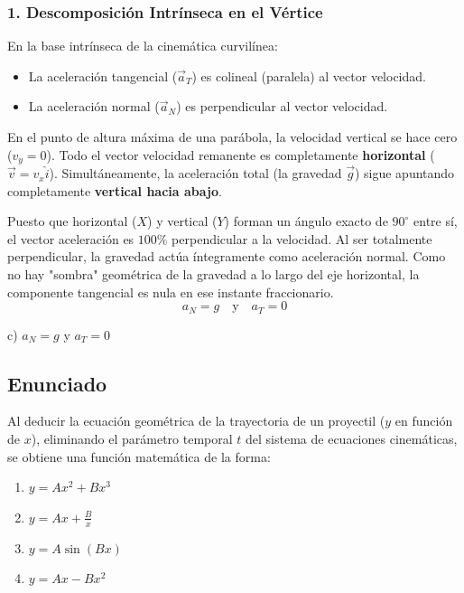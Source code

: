 \documentclass[12pt, a4paper]{article}
\begin{document}
\subsubsection*{1. Descomposición Intrínseca en el Vértice}
En la base intrínseca de la cinemática curvilínea:
\begin{itemize}
    \item La aceleración tangencial ($\vec{a}_T$) es colineal (paralela) al vector velocidad.
    \item La aceleración normal ($\vec{a}_N$) es perpendicular al vector velocidad.
\end{itemize}

En el punto de altura máxima de una parábola, la velocidad vertical se hace cero ($v_y = 0$). Todo el vector velocidad remanente es completamente \textbf{horizontal} ($\vec{v} = v_x\hat{i}$).
Simultáneamente, la aceleración total (la gravedad $\vec{g}$) sigue apuntando completamente \textbf{vertical hacia abajo}.

Puesto que horizontal ($X$) y vertical ($Y$) forman un ángulo exacto de $90^\circ$ entre sí, el vector aceleración es $100\%$ perpendicular a la velocidad. 
Al ser totalmente perpendicular, la gravedad actúa íntegramente como aceleración normal. Como no hay "sombra" geométrica de la gravedad a lo largo del eje horizontal, la componente tangencial es nula en ese instante fraccionario.
$$ a_N = g \quad \text{y} \quad a_T = 0 $$

\begin{tcolorbox}[colback=green!5!white, colframe=green!50!black, title=Respuesta Final]
\centering \Large c) $a_N = g$ y $a_T = 0$
\end{tcolorbox}

\newpage

\subsection*{Enunciado}
Al deducir la ecuación geométrica de la trayectoria de un proyectil ($y$ en función de $x$), eliminando el parámetro temporal $t$ del sistema de ecuaciones cinemáticas, se obtiene una función matemática de la forma:
\begin{enumerate}[label=\alph*)]
    \item $y = Ax^2 + Bx^3$
    \item $y = Ax + \frac{B}{x}$
    \item $y = A \sin(Bx)$
    \item $y = Ax - Bx^2$
\end{enumerate}
\end{document}
